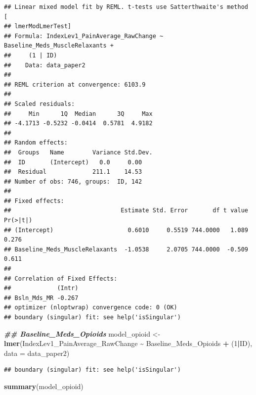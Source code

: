\documentclass[
  12pt,
]{article}
\newenvironment{Shaded}{\begin{snugshade}}{\end{snugshade}}
\newcommand{\AttributeTok}[1]{\textcolor[rgb]{0.13,0.29,0.53}{#1}}
\newcommand{\DecValTok}[1]{\textcolor[rgb]{0.00,0.00,0.81}{#1}}
\newcommand{\DocumentationTok}[1]{\textcolor[rgb]{0.56,0.35,0.01}{\textbf{\textit{#1}}}}
\newcommand{\FunctionTok}[1]{\textcolor[rgb]{0.13,0.29,0.53}{\textbf{#1}}}
\newcommand{\NormalTok}[1]{#1}
\newcommand{\OtherTok}[1]{\textcolor[rgb]{0.56,0.35,0.01}{#1}}
\newcommand{\SpecialCharTok}[1]{\textcolor[rgb]{0.81,0.36,0.00}{\textbf{#1}}}
\begin{document}
\begin{verbatim}
## Linear mixed model fit by REML. t-tests use Satterthwaite's method [
## lmerModLmerTest]
## Formula: IndexLev1_PainAverage_RawChange ~ Baseline_Meds_MuscleRelaxants +  
##     (1 | ID)
##    Data: data_paper2
## 
## REML criterion at convergence: 6103.9
## 
## Scaled residuals: 
##     Min      1Q  Median      3Q     Max 
## -4.1713 -0.5232 -0.0414  0.5781  4.9182 
## 
## Random effects:
##  Groups   Name        Variance Std.Dev.
##  ID       (Intercept)   0.0     0.00   
##  Residual             211.1    14.53   
## Number of obs: 746, groups:  ID, 142
## 
## Fixed effects:
##                               Estimate Std. Error       df t value Pr(>|t|)
## (Intercept)                     0.6010     0.5519 744.0000   1.089    0.276
## Baseline_Meds_MuscleRelaxants  -1.0538     2.0705 744.0000  -0.509    0.611
## 
## Correlation of Fixed Effects:
##             (Intr)
## Bsln_Mds_MR -0.267
## optimizer (nloptwrap) convergence code: 0 (OK)
## boundary (singular) fit: see help('isSingular')
\end{verbatim}

\begin{Shaded}
\begin{Highlighting}[]
\DocumentationTok{\#\# Baseline\_Meds\_Opioids}
\NormalTok{model\_opioid }\OtherTok{\textless{}{-}} \FunctionTok{lmer}\NormalTok{(IndexLev1\_PainAverage\_RawChange }\SpecialCharTok{\textasciitilde{}}\NormalTok{ Baseline\_Meds\_Opioids }\SpecialCharTok{+}\NormalTok{ (}\DecValTok{1}\SpecialCharTok{|}\NormalTok{ID), }\AttributeTok{data =}\NormalTok{ data\_paper2)}
\end{Highlighting}
\end{Shaded}

\begin{verbatim}
## boundary (singular) fit: see help('isSingular')
\end{verbatim}

\begin{Shaded}
\begin{Highlighting}[]
\FunctionTok{summary}\NormalTok{(model\_opioid)}
\end{Highlighting}
\end{Shaded}
\end{document}
